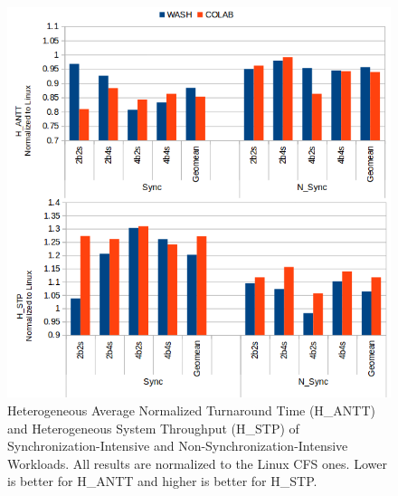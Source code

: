 \begin{figure}
\centering
\includegraphics[scale=0.39]{figures/sync.png}
\caption{Heterogeneous Average Normalized Turnaround Time (H\_ANTT) and Heterogeneous System Throughput (H\_STP) of Synchronization-Intensive and Non-Synchronization-Intensive Workloads. All results are normalized to the Linux CFS ones. Lower is better for H\_ANTT and higher is better for H\_STP.}
\label{sync}
\end{figure} 

